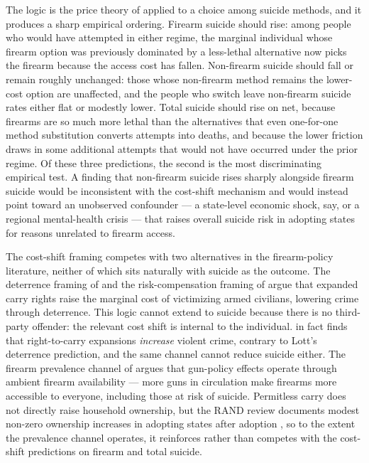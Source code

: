 \documentclass[12pt]{article}
\newcommand{\citepg}[2]{\citep[][p.~#2]{#1}}  %
\begin{document}
The logic is the price theory of \citet{becker1968} applied to a
choice among suicide methods, and it produces a sharp empirical
ordering. Firearm suicide should rise: among people who would have
attempted in either regime, the marginal individual whose firearm
option was previously dominated by a less-lethal alternative now
picks the firearm because the access cost has fallen. Non-firearm
suicide should fall or remain roughly unchanged: those whose
non-firearm method remains the lower-cost option are unaffected,
and the people who switch leave non-firearm suicide rates either
flat or modestly lower. Total suicide should rise on net, because
firearms are so much more lethal than the alternatives that even
one-for-one method substitution converts attempts into deaths, and
because the lower friction draws in some additional attempts that
would not have occurred under the prior regime. Of these three
predictions, the second is the most discriminating empirical test.
A finding that non-firearm suicide rises sharply alongside firearm
suicide would be inconsistent with the cost-shift mechanism and
would instead point toward an unobserved confounder --- a state-level
economic shock, say, or a regional mental-health crisis --- that
raises overall suicide risk in adopting states for reasons
unrelated to firearm access.

The cost-shift framing competes with two alternatives in the
firearm-policy literature, neither of which sits naturally with
suicide as the outcome. The deterrence framing of \citet{lott1997}
and the risk-compensation framing of \citet{peltzman1975} argue
that expanded carry rights raise the marginal cost of victimizing
armed civilians, lowering crime through deterrence. This logic
cannot extend to suicide because there is no third-party offender:
the relevant cost shift is internal to the individual.
\citet{donohue2019} in fact finds that right-to-carry expansions
\emph{increase} violent crime, contrary to Lott's deterrence
prediction, and the same channel cannot reduce suicide either. The
firearm prevalence channel of \citet{cookludwig2006} argues that
gun-policy effects operate through ambient firearm
availability --- more guns in circulation make firearms more
accessible to everyone, including those at risk of suicide.
Permitless carry does not directly raise household ownership, but
the RAND review documents modest non-zero ownership increases in
adopting states after adoption \citepg{rand2024}{42}, so to the
extent the prevalence channel operates, it reinforces rather than
competes with the cost-shift predictions on firearm and total
suicide.
\end{document}
